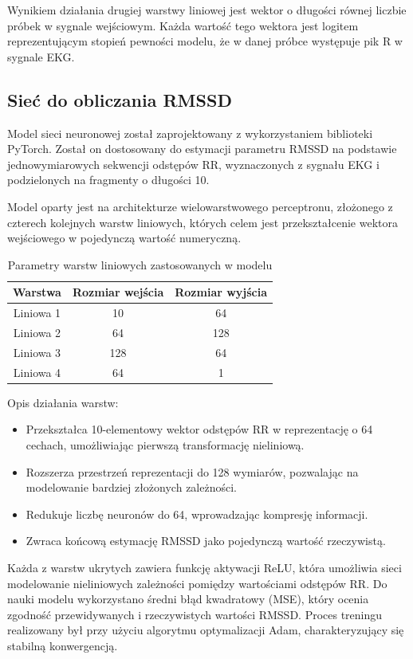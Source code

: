 \documentclass{article}
\begin{document}
Wynikiem działania drugiej warstwy liniowej jest wektor o długości równej liczbie próbek w sygnale wejściowym. Każda wartość tego wektora jest logitem reprezentującym stopień pewności modelu, że w danej próbce występuje pik R w sygnale EKG.

\subsection{Sieć do obliczania RMSSD}
Model sieci neuronowej został zaprojektowany z wykorzystaniem biblioteki PyTorch. Został on dostosowany do estymacji parametru RMSSD na podstawie jednowymiarowych sekwencji odstępów RR, wyznaczonych z sygnału EKG i podzielonych na fragmenty o długości 10.

Model oparty jest na architekturze wielowarstwowego perceptronu, złożonego z czterech kolejnych warstw liniowych, których celem jest przekształcenie wektora wejściowego w pojedynczą wartość numeryczną.

\begin{table}[h!]
\renewcommand{\arraystretch}{1.3}
\centering
\begin{tabular}{|c|c|c|}
\hline
\textbf{Warstwa} & \textbf{Rozmiar wejścia} & \textbf{Rozmiar wyjścia} \\
\hline
Liniowa 1 & 10 & 64 \\
Liniowa 2 & 64 & 128 \\
Liniowa 3 & 128 & 64 \\
Liniowa 4 & 64 & 1 \\
\hline
\end{tabular}
\caption{Parametry warstw liniowych zastosowanych w modelu}
\end{table}

Opis działania warstw:
\begin{itemize}
    \item Przekształca 10-elementowy wektor odstępów RR w reprezentację o 64 cechach, umożliwiając pierwszą transformację nieliniową.
    \item Rozszerza przestrzeń reprezentacji do 128 wymiarów, pozwalając na modelowanie bardziej złożonych zależności.
    \item Redukuje liczbę neuronów do 64, wprowadzając kompresję informacji.
    \item Zwraca końcową estymację RMSSD jako pojedynczą wartość rzeczywistą.
\end{itemize}

Każda z warstw ukrytych zawiera funkcję aktywacji ReLU, która umożliwia sieci modelowanie nieliniowych zależności pomiędzy wartościami odstępów RR. 
Do nauki modelu wykorzystano średni błąd kwadratowy (MSE), który ocenia zgodność przewidywanych i rzeczywistych wartości RMSSD. Proces treningu realizowany był przy użyciu algorytmu optymalizacji Adam, charakteryzujący się stabilną konwergencją.
\end{document}
